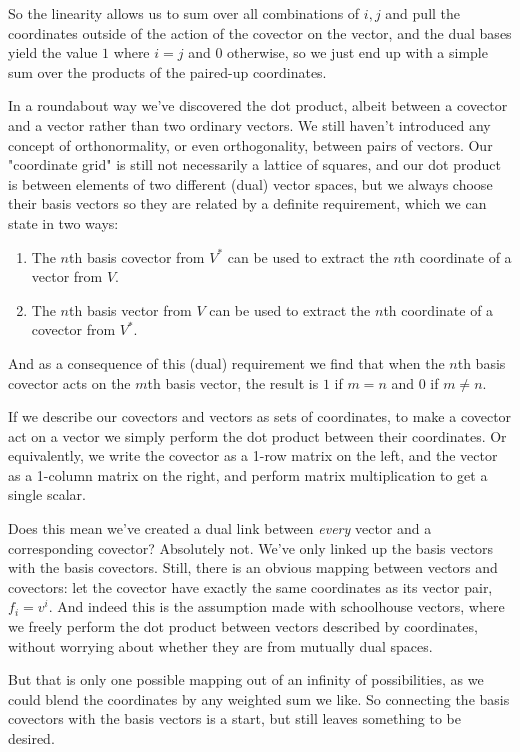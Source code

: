 So the linearity allows us to sum over all combinations of $i, j$ and pull the coordinates outside of the action of the covector on the vector, and the dual bases yield the value $1$ where $i = j$ and $0$ otherwise, so we just end up with a simple sum over the products of the paired-up coordinates.

In a roundabout way we've discovered the dot product, albeit between a covector and a vector rather than two ordinary vectors. We still haven't introduced any concept of orthonormality, or even orthogonality, between pairs of vectors. Our "coordinate grid" is still not necessarily a lattice of squares, and our dot product is between elements of two different (dual) vector spaces, but we always choose their basis vectors so they are related by a definite requirement, which we can state in two ways:

\begin{enumerate}
    \item The $n$th basis covector from $V^*$ can be used to extract the $n$th coordinate of a vector from $V$.
    \item The $n$th basis vector from $V$ can be used to extract the $n$th coordinate of a covector from $V^*$.
\end{enumerate}

And as a consequence of this (dual) requirement we find that when the $n$th basis covector acts on the $m$th basis vector, the result is $1$ if $m = n$ and $0$ if $m \ne n$.

If we describe our covectors and vectors as sets of coordinates, to make a covector act on a vector we simply perform the dot product between their coordinates. Or equivalently, we write the covector as a 1-row matrix on the left, and the vector as a 1-column matrix on the right, and perform matrix multiplication to get a single scalar.

Does this mean we've created a dual link between \textit{every} vector and a corresponding covector? Absolutely not. We've only linked up the basis vectors with the basis covectors. Still, there is an obvious mapping between vectors and covectors: let the covector have exactly the same coordinates as its vector pair, $f_i = v^i$. And indeed this is the assumption made with schoolhouse vectors, where we freely perform the dot product between vectors described by coordinates, without worrying about whether they are from mutually dual spaces.

But that is only one possible mapping out of an infinity of possibilities, as we could blend the coordinates by any weighted sum we like. So connecting the basis covectors with the basis vectors is a start, but still leaves something to be desired.

